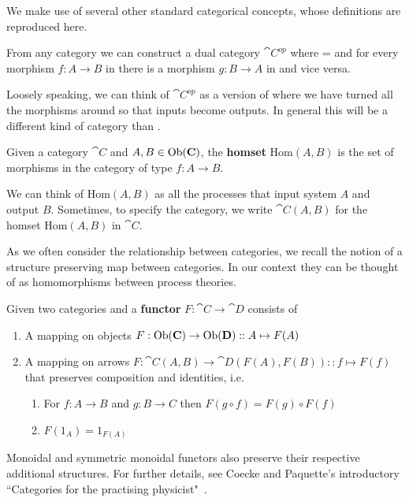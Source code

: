 We make use of several other standard categorical concepts, whose definitions are reproduced here.

\begin{defn}
From any category  we can construct a dual category $\cat{C^{op}}$ where  =  and for every morphism $f:A\to B$ in  there is a morphism $g:B\to A$ in  and vice versa.
\end{defn}

Loosely speaking, we can think of $\cat{C^{op}}$ as a version of  where we have turned all the morphisms around so that inputs become outputs. In general this will be a different kind of category than .

\begin{defn}
Given a category $\cat{C}$ and $A,B\in\mbox{Ob}(\mathbf{C})$, the \textbf{homset} Hom$(A,B)$ is the set of morphisms in the category of type $f:A\to B$.
\end{defn}

We can think of Hom$(A,B)$ as all the processes that input system $A$ and output $B$. Sometimes, to specify the category, we write $\cat{C}(A,B)$ for the homset Hom$(A,B)$ in $\cat{C}$.

As we often consider the relationship between categories, we recall the notion of a structure preserving map between categories. In our context they can be thought of as homomorphisms between process theories.

\begin{defn}
Given two categories  and  a \textbf{functor} $F:\cat{C}\to\cat{D}$ consists of
\begin{enumerate}
\item A mapping on objects $F:\mbox{Ob}(\mathbf{C})\to\mbox{Ob}(\mathbf{D})::A\mapsto F(A)$
\item A mapping on arrows $F:\cat{C}(A,B)\to\cat{D}(F(A),F(B))::f\mapsto F(f)$ that preserves composition and identities, i.e. 
\begin{enumerate}
\item For $f:A\to B$ and $g:B\to C$ then $F(g\circ f) = F(g)\circ F(f)$
\item $F(1_A)=1_{F(A)}$
\end{enumerate}
\end{enumerate}
\end{defn}

\noindent Monoidal and symmetric monoidal functors also preserve their respective additional structures. For further details, see Coecke and Paquette's introductory ``Categories for the practising physicist"~\cite{coecke2011categories}.


